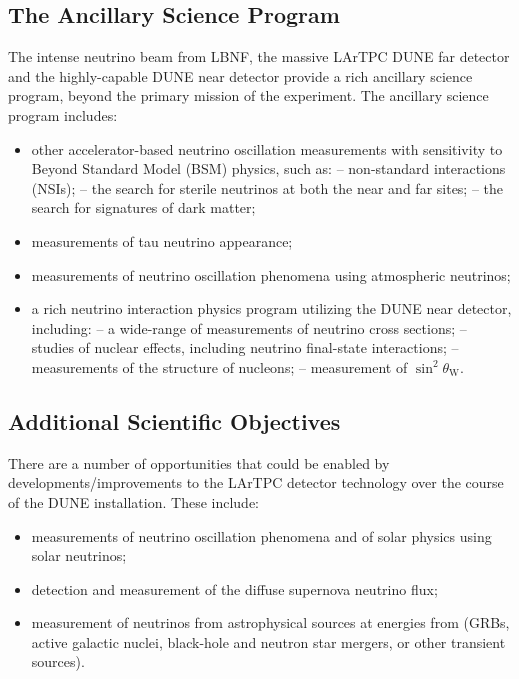 \subsection{The Ancillary Science Program}

The intense neutrino beam from LBNF, the massive LArTPC DUNE far detector and the highly-capable DUNE near detector provide a rich ancillary science program, beyond the primary mission of the experiment. The ancillary science program includes:
\begin{itemize}
     \item other accelerator-based neutrino oscillation measurements with sensitivity to Beyond Standard Model (BSM) physics, such as:    
            \subitem -- non-standard interactions (NSIs);
             \subitem -- the search for sterile neutrinos at both the near and far sites;
             \subitem -- the search for signatures of dark matter; 
     \item measurements of tau neutrino appearance;
     \item measurements of neutrino oscillation phenomena using atmospheric neutrinos;
     \item a rich neutrino interaction physics program utilizing the DUNE near detector, including:
         \subitem -- a wide-range of measurements of neutrino cross sections;
         \subitem -- studies of nuclear effects, including neutrino final-state interactions;
         \subitem -- measurements of the structure of nucleons;      
         \subitem -- measurement of $\sin^2\theta_\text{W}$.     
\end{itemize} 

\subsection{Additional Scientific Objectives}
There are a number of opportunities that could be enabled by developments/improvements to the LArTPC detector technology over the course of the DUNE installation. These include:
\begin{itemize}
      \item measurements of neutrino oscillation phenomena and of solar physics using solar neutrinos;
      \item detection and measurement of the diffuse supernova neutrino flux;
      \item measurement of neutrinos from astrophysical sources at energies from (GRBs, active galactic nuclei, black-hole and neutron star mergers, or other transient sources).
\end{itemize}


 

